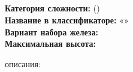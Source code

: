 \begin{samepage}
  \section{\routeTitle}
  \noindent \textbf{Категория сложности:} \routeCategory (\routeType)\\
  \noindent \textbf{Название в классификаторе:} «\routeName»\\
  \noindent \textbf{Вариант набора железа:} \routeEquipment\\
  \noindent \textbf{Максимальная высота: } 

  \hspace{1em}
\end{samepage}


\routeDescription{}

\vspace{1em}
\hfill { описания: \routeAuthors}
